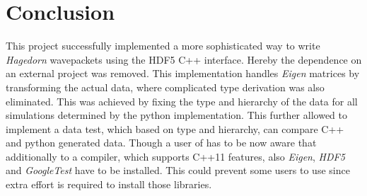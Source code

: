 \chapter{Conclusion}
This project successfully implemented a more sophisticated way to write \textit{Hagedorn} wavepackets using the HDF5 C++ interface. Hereby the dependence on an external project \cite{eigen3-hdf5} was removed. This implementation handles \textit{Eigen} matrices by transforming the actual data, where complicated type derivation was also eliminated. This was achieved by fixing the type and hierarchy of the data for all simulations determined by the python implementation. This further allowed to implement a data test, which based on type and hierarchy, can compare C++ and python generated data. Though a user of \cite{libwaveblocks} has to be now aware that additionally to a compiler, which supports C++11 features, also \textit{Eigen}, \textit{HDF5} and \textit{GoogleTest} have to be installed. This could prevent some users to use \cite{libwaveblocks} since extra effort is required to install those libraries.


